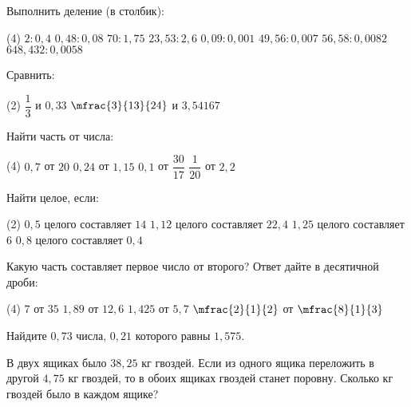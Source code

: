 \begin{class}[number=2]
	\begin{listofex}
		\item Выполнить деление (в столбик):
		\begin{tasks}(4)
			\task \( 2:0,4 \)
			\task \( 0,48:0,08 \)
			\task \( 70:1,75 \)
			\task \( 23,53:2,6 \)
			\task \( 0,09:0,001 \)
			\task \( 49,56:0,007 \)
			\task \( 56,58:0,0082 \)
			\task \( 648,432:0,0058 \)
		\end{tasks}
		\item Сравнить:
		\begin{tasks}(2)
			\task \( \dfrac{1}{3} \) и \( 0,33 \)
			\task \( \mfrac{3}{13}{24} \) и \( 3,54167 \)
		\end{tasks}
		\item Найти часть от числа:
		\begin{tasks}(4)
			\task \( 0,7 \) от \( 20 \)
			\task \( 0,24 \) от \( 1,15 \)
			\task \( 0,1 \) от \( \dfrac{30}{17} \)
			\task \( \dfrac{1}{20} \) от \( 2,2 \)
		\end{tasks}
		\item Найти целое, если:
		\begin{tasks}(2)
			\task \( 0,5 \) целого составляет \( 14 \)
			\task \( 1,12 \) целого составляет \( 22,4 \)
			\task \( 1,25 \) целого составляет \( 6 \)
			\task \( 0,8 \) целого составляет \( 0,4 \)
		\end{tasks}
		\item Какую часть составляет первое число от второго? Ответ дайте в десятичной дроби:
		\begin{tasks}(4)
			\task \( 7 \) от \( 35 \)
			\task \( 1,89 \) от \( 12,6 \)
			\task \( 1,425 \) от \( 5,7 \)
			\task \( \mfrac{2}{1}{2} \) от \( \mfrac{8}{1}{3} \)
		\end{tasks}
		\item Найдите \( 0,73 \) числа, \( 0,21 \) которого равны \( 1,575 \).
		\item В двух ящиках было \( 38,25 \) кг гвоздей. Если из одного ящика переложить в другой \( 4,75 \) кг гвоздей, то в обоих ящиках гвоздей станет поровну. Сколько кг гвоздей было в каждом ящике?
	\end{listofex}
\end{class}
%
%
